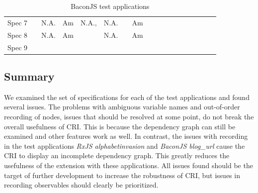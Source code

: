 \begin{table}[]
{\begin{tabular}{llllllllllllllllll}
		Spec 7 & \myes         & N.A.       & Am       & N.A.,\myes & N.A.       & \myes                                 & Am                   & \myes                 & \myes               & \myes               & \myes            & \myes         & \myes                   & \myes                & \myes                 & \myes       & \myes \\
		Spec 8 & \myes         & N.A.       & Am       & \myes      & N.A.       & \mno                                 & Am                   & \myes                 & \myes               & \myes               & \myes            & \mno         & \myes                   & \myes                & \myes                 & \myes       & \myes \\
		Spec 9 & \myes         & \myes         & \myes        & \myes      & \myes         & \myes                                 & \myes                    & \myes                 & \myes               & \myes               & \myes            & \myes         & \myes                   & \myes                & \myes                 & \myes       & \myes
	\end{tabular}%
}
\caption{BaconJS test applications}
\label{tab:BaconJS}
\end{table}

\subsection{Summary}
We examined the set of specifications for each of the test applications and found several issues. The problems with ambiguous variable names and out-of-order recording of nodes, issues that should be resolved at some point, do not break the overall usefulness of CRI. This is because the dependency graph can still be examined and other features work as well. In contrast, the issues with recording in the test applications \emph{RxJS alphabetinvasion} and \emph{BaconJS blog\_url} cause the CRI to display an incomplete dependency graph. This greatly reduces the usefulness of the extension with these applications.
All issues found should be the target of further development to increase the robustness of CRI, but issues in recording observables should clearly be prioritized.